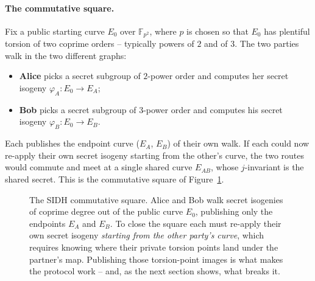 \paragraph{The commutative square.}
Fix a public starting curve $E_0$ over $\mathbb{F}_{p^2}$, where $p$ is chosen so that $E_0$ has plentiful torsion of two coprime orders -- typically powers of $2$ and of $3$. The two parties walk in the two different graphs:
\begin{itemize}
  \item \textbf{Alice} picks a secret subgroup of $2$-power order and computes her secret isogeny $\varphi_A : E_0 \to E_A$;
  \item \textbf{Bob} picks a secret subgroup of $3$-power order and computes his secret isogeny $\varphi_B : E_0 \to E_B$.
\end{itemize}
Each publishes the endpoint curve ($E_A$, $E_B$) of their own walk. If each could now re-apply their own secret isogeny starting from the other's curve, the two routes would commute and meet at a single shared curve $E_{AB}$, whose $j$-invariant is the shared secret. This is the commutative square of Figure~\ref{fig:sidh-square}.

\begin{figure}[H]
\centering
{}
\caption{The SIDH commutative square. Alice and Bob walk secret isogenies of coprime degree out of the public curve $E_0$, publishing only the endpoints $E_A$ and $E_B$. To close the square each must re-apply their own secret isogeny \emph{starting from the other party's curve}, which requires knowing where their private torsion points land under the partner's map. Publishing those torsion-point images is what makes the protocol work -- and, as the next section shows, what breaks it.}
\label{fig:sidh-square}
\end{figure}

